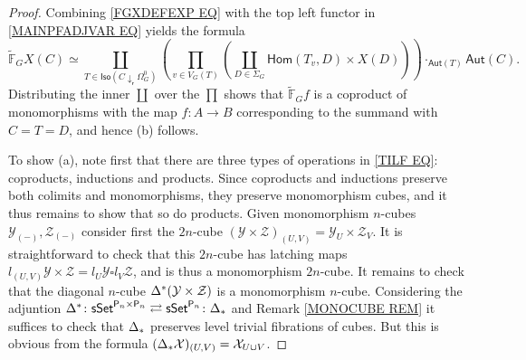 \documentclass[a4paper,10pt
,draft
]{article}%
\numberwithin{equation}{section}
\numberwithin{figure}{section}
\theoremstyle{definition} %
\newcommand{\1}{\ensuremath{\mathbbm 1}}%
\begin{document}
\begin{proof}
	Combining \eqref{FGXDEFEXP EQ} with
	the top left functor in \eqref{MAINPFADJVAR EQ}
	yields the formula
\begin{equation}\label{TILF EQ}
\widetilde{\mathbb{F}}_G X (C) \simeq
\coprod_{T \in 
\mathsf{Iso}(C \downarrow_{\mathsf{r}} \Omega_G^0)}
\left(
\prod_{v \in V_G(T)}
\left(
	\coprod_{D\in \Sigma_G} \mathsf{Hom}(T_v,D) \times X(D)
\right)
\right) 
\cdot_{\mathsf{Aut}(T)} \mathsf{Aut}(C).
\end{equation}
	Distributing the inner $\coprod$ over the 
	$\prod$ %
	shows that 
	$\widetilde{\mathbb{F}}_G f$
	is a coproduct of monomorphisms with the map
	$f \colon A \to B$
	corresponding to the summand with $C=T=D$, and hence (b) follows.
	
	To show (a), note first that there are three types of operations in \eqref{TILF EQ}:
	coproducts, inductions and products.
	Since coproducts and inductions preserve both colimits and monomorphisms, they preserve monomorphism cubes,
	and it thus remains to show that so do products.
	Given monomorphism $n$-cubes
	$\mathcal{Y}_{(\minus)}, \mathcal{Z}_{(\minus)}$
	consider first the $2n$-cube 
	$(\mathcal{Y} \times \mathcal{Z})_{(U,V)} = \mathcal{Y}_U \times \mathcal{Z}_V$.
	It is straightforward to check that this $2n$-cube has latching maps
	$l_{(U,V)} \mathcal{Y} \times \mathcal{Z} =
	 l_U \mathcal{Y} \square l_V \mathcal{Z}$,
	and is thus a monomorphism $2n$-cube.
	It remains to check that
	the diagonal $n$-cube 
	$\Delta^{\**} (\mathcal{Y} \times \mathcal{Z})$
	is a monomorphism $n$-cube.
Considering the adjuntion
	$\Delta^{\**}\colon 
	\mathsf{sSet}^{\mathsf{P}_n \times \mathsf{P}_n}
		\rightleftarrows
	\mathsf{sSet}^{\mathsf{P}_n}
	\colon \Delta_{\**}
	$
and Remark \ref{MONOCUBE REM} it suffices to check that
$\Delta_{\**}$ preserves level trivial fibrations of cubes. But this is obvious from the formula
$(\Delta_{\**} \mathcal{X})_{(U,V)} = \mathcal{X}_{U \cup V}$.	
\end{proof}
\end{document}
